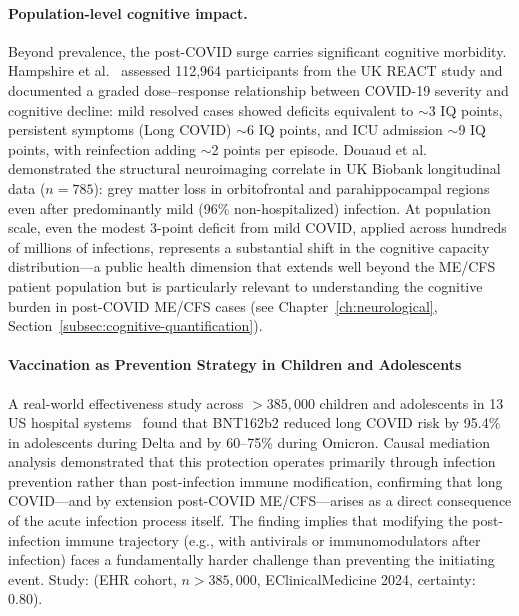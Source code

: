 \paragraph{Population-level cognitive impact.} Beyond prevalence, the post-COVID surge carries significant cognitive morbidity. Hampshire et al.~\cite{Hampshire2024cognition} assessed 112,964 participants from the UK REACT study and documented a graded dose--response relationship between COVID-19 severity and cognitive decline: mild resolved cases showed deficits equivalent to $\sim$3 IQ points, persistent symptoms (Long COVID) $\sim$6 IQ points, and ICU admission $\sim$9 IQ points, with reinfection adding $\sim$2 points per episode. Douaud et al.~\cite{Douaud2022brain} demonstrated the structural neuroimaging correlate in UK Biobank longitudinal data ($n = 785$): grey matter loss in orbitofrontal and parahippocampal regions even after predominantly mild (96\% non-hospitalized) infection. At population scale, even the modest 3-point deficit from mild COVID, applied across hundreds of millions of infections, represents a substantial shift in the cognitive capacity distribution---a public health dimension that extends well beyond the ME/CFS patient population but is particularly relevant to understanding the cognitive burden in post-COVID ME/CFS cases (see Chapter~\ref{ch:neurological}, Section~\ref{subsec:cognitive-quantification}).

\paragraph{Vaccination as Prevention Strategy in Children and Adolescents}

\begin{achievement}
\label{ach:wu2024-bnt162b2-long-covid}
A real-world effectiveness study across $>385{,}000$ children and adolescents in
13 US hospital systems~\cite{Wu2024LongCovidChildren} found that BNT162b2 reduced
long COVID risk by 95.4\% in adolescents during Delta and by 60--75\% during Omicron.
Causal mediation analysis demonstrated that this protection operates primarily through
infection prevention rather than post-infection immune modification, confirming that
long COVID---and by extension post-COVID ME/CFS---arises as a direct consequence of
the acute infection process itself. The finding implies that modifying the post-infection
immune trajectory (e.g., with antivirals or immunomodulators after infection) faces a
fundamentally harder challenge than preventing the initiating event.
Study: (EHR cohort, $n>385{,}000$, EClinicalMedicine 2024, certainty: 0.80).
\end{achievement}


